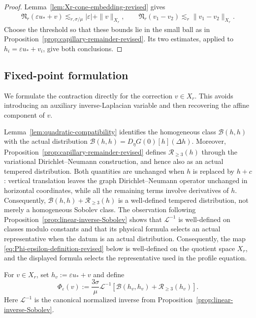 \documentclass[12pt]{amsart}
\theoremstyle{remark}
\theoremstyle{definition}
\numberwithin{equation}{section}
\begin{document}
\begin{proof}
Lemma~\ref{lem:Xr-cone-embedding-revised} gives
\begin{align*}
 \mathfrak N_r(\varepsilon u_*+v)\lesssim_{r,\sigma/\mu}
 |\varepsilon|+\|v\|_{X_r},\qquad \mathfrak N_r(v_1-v_2)\lesssim_r\|v_1-v_2\|_{X_r}.
\end{align*}
Choose the threshold so that these bounds lie in the small ball as in Proposition~\ref{prop:capillary-remainder-revised}.  
Its two estimates, applied to \(h_i=\varepsilon u_*+v_i\), give both conclusions.
\end{proof}

\subsection{Fixed-point formulation}

We formulate the contraction directly for the correction \(v\in X_r\).
This avoids introducing an auxiliary inverse-Laplacian variable and then recovering the affine component of \(v\).

Lemma~\ref{lem:quadratic-compatibility} identifies the homogeneous
class \(\mathcal B(h,h)\) with the actual distribution
\(
 \mathcal B(h,h) = D_\eta G(0)[h](\Delta h).
\)
Moreover, Proposition~\ref{prop:capillary-remainder-revised} defines \(\mathscr R_{\geq3}(h)\) through the variational Dirichlet--Neumann construction, and hence also as an actual tempered distribution. 
Both quantities are unchanged when \(h\) is replaced by \(h+c\): vertical translation leaves the graph Dirichlet--Neumann operator unchanged in horizontal coordinates,
while all the remaining terms involve derivatives of \(h\).
Consequently,
\(
 \mathcal B(h,h)+\mathscr R_{\geq3}(h)
\)
is a well-defined tempered distribution, not merely a homogeneous
Sobolev class.
The observation following Proposition~\ref{prop:linear-inverse-Sobolev} shows that
\(\mathcal L^{-1}\) is well-defined on classes modulo constants and that its physical formula selects an actual representative when the datum is an actual distribution. 
Consequently, the map \eqref{eq:Phi-epsilon-definition-revised} below is well-defined on the quotient space \(X_r\), and the displayed formula selects the representative used in the profile equation.

For \(v\in X_r\), set \(h_v:=\varepsilon u_*+v\) and define
\begin{equation}
\label{eq:Phi-epsilon-definition-revised}
 \Phi_\varepsilon(v) := \frac{3\sigma}{\mu}\mathcal L^{-1} \left[ \mathcal B(h_v,h_v) + \mathscr R_{\geq3}(h_v) \right].
\end{equation}
Here \(\mathcal L^{-1}\) is the canonical normalized inverse from
Proposition~\ref{prop:linear-inverse-Sobolev}.
\end{document}
